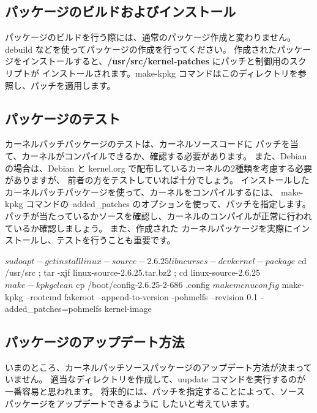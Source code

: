 \documentclass[mingoth,a4paper]{jsarticle}
\begin{document}
\subsection{パッケージのビルドおよびインストール}
パッケージのビルドを行う際には、通常のパッケージ作成と変わりません。
debuild などを使ってパッケージの作成を行ってください。
作成されたパッケージをインストールすると、{\bf /usr/src/kernel-patches} にパッチと制御用のスクリプトが
インストールされます。make-kpkg コマンドはこのディレクトリを参照し、パッチを適用します。
\begin{commandline}
\end{commandline}

\subsection{パッケージのテスト}
カーネルパッチパッケージのテストは、カーネルソースコードに
パッチを当て、カーネルがコンパイルできるか、確認する必要があります。
また、Debian の場合は、Debian と kernel.org で配布しているカーネルの2種類を考慮する必要がありますが、
前者の方をテストしていれば十分でしょう。
インストールしたカーネルパッチパッケージを使って、カーネルをコンパイルするには、
make-kpkg コマンドの--added\_patches のオプションを使って、パッチを指定します。
パッチが当たっているかソースを確認し、カーネルのコンパイルが正常に行われているか確認しましょう。
また、作成された カーネルパッケージを実際にインストールし、テストを行うことも重要です。

\begin{commandline}
$ sudo apt-get install linux-source-2.6.25 libncurses-dev kernel-package
$ cd /usr/src ; tar -xjf linux-source-2.6.25.tar.bz2 ; cd linux-source-2.6.25
$ make-kpkg clean
$ cp /boot/config-2.6.25-2-686 .config
$ make menuconfig
$ make-kpkg --rootcmd fakeroot --append-to-version -pohmelfs --revision 0.1 -added_patches=pohmelfs kernel-image
\end{commandline}

\subsection{パッケージのアップデート方法}
いまのところ、カーネルパッチソースパッケージのアップデート方法が決まっていません。
適当なディレクトリを作成して、uupdate コマンドを実行するのが一番容易と思われます。
将来的には、パッチを指定することによって、ソースパッケージをアップデートできるように
したいと考えています。
\end{document}
